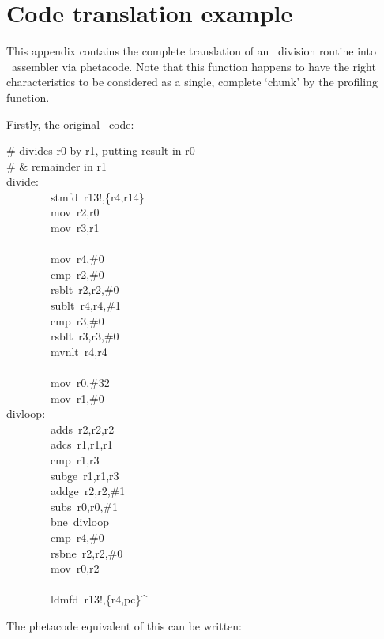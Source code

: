 \chapter{Code translation example}

This appendix contains the complete translation of an \arm\ division routine into \ia\ assembler via phetacode. Note that this function happens to have the right characteristics to be considered as a single, complete `chunk' by the profiling function.

Firstly, the original \arm\ code:

\begin{code}
\# divides r0 by r1, putting result in r0\\
\# \& remainder in r1\\
divide:\\
~~~~~~~~stmfd~r13!,\{r4,r14\}\\
~~~~~~~~mov~r2,r0\\
~~~~~~~~mov~r3,r1\\
~\\
~~~~~~~~mov~r4,\#0\\
~~~~~~~~cmp~r2,\#0\\
~~~~~~~~rsblt~r2,r2,\#0\\
~~~~~~~~sublt~r4,r4,\#1\\
~~~~~~~~cmp~r3,\#0\\
~~~~~~~~rsblt~r3,r3,\#0\\
~~~~~~~~mvnlt~r4,r4\\
~\\
~~~~~~~~mov~r0,\#32\\
~~~~~~~~mov~r1,\#0\\
divloop:\\
~~~~~~~~adds~r2,r2,r2\\
~~~~~~~~adcs~r1,r1,r1\\
~~~~~~~~cmp~r1,r3\\
~~~~~~~~subge~r1,r1,r3\\
~~~~~~~~addge~r2,r2,\#1\\
~~~~~~~~subs~r0,r0,\#1\\
~~~~~~~~bne~divloop\\
~~~~~~~~cmp~r4,\#0\\
~~~~~~~~rsbne~r2,r2,\#0\\
~~~~~~~~mov~r0,r2\\
~\\
~~~~~~~~ldmfd~r13!,\{r4,pc\}\^{}
\end{code}

The phetacode equivalent of this can be written:

